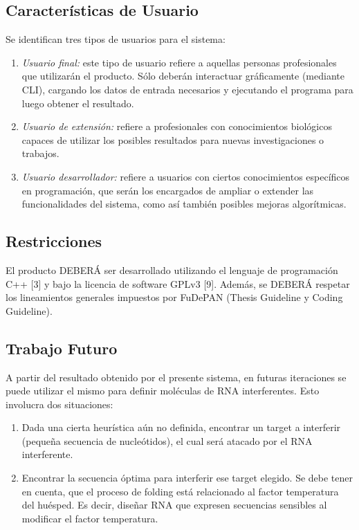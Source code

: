 \documentclass[12pt,a4paper,english,spanish]{article}
\begin{document}
\subsection{Características de Usuario}
	Se identifican tres tipos de usuarios para el sistema:
	\begin{enumerate}
 		\item \textit{Usuario final:} este tipo de usuario refiere a aquellas personas profesionales que utilizarán el 										producto. Sólo deberán interactuar gráficamente (mediante CLI), cargando los datos de entrada 										necesarios y ejecutando el programa para luego obtener el resultado. 
		\item \textit{Usuario de extensión:} refiere a profesionales con conocimientos biológicos capaces de utilizar los 												posibles resultados para nuevas investigaciones o trabajos.
		\item \textit{Usuario desarrollador:} refiere a usuarios con ciertos conocimientos específicos en programación, 											que serán los encargados de ampliar o extender las funcionalidades del 												sistema, como así también posibles mejoras algorítmicas.
	\end{enumerate}

\subsection{Restricciones}
	El producto DEBERÁ ser desarrollado utilizando el lenguaje de programación C++ [3] y bajo la licencia de software 		GPLv3 [9]. Además, se DEBERÁ respetar los lineamientos generales impuestos por FuDePAN (Thesis Guideline y Coding Guideline). 

\subsection{Trabajo Futuro}
A partir del resultado obtenido por el presente sistema, en futuras iteraciones se puede utilizar el mismo para definir moléculas de RNA interferentes. Esto involucra dos situaciones:
\begin{enumerate}
	\item Dada una cierta heurística aún no definida, encontrar un target a interferir (pequeña secuencia de nucleótidos), el cual será atacado por el RNA 			interferente.
	\item Encontrar la secuencia óptima para interferir ese target elegido. Se debe tener en cuenta, que el proceso de folding está relacionado 			al factor temperatura del huésped. Es decir, diseñar RNA que expresen secuencias sensibles al modificar el factor temperatura.
\end{enumerate}
\end{document}
